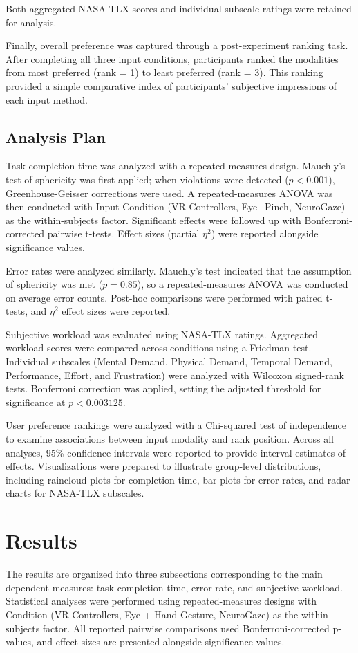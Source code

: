 \documentclass[utf8]{FrontiersinHarvard} %
\begin{document}
Both aggregated NASA-TLX scores and individual subscale ratings were retained for analysis.

Finally, overall preference was captured through a post-experiment ranking task. After completing all three input conditions, participants ranked the modalities from most preferred (rank = 1) to least preferred (rank = 3). This ranking provided a simple comparative index of participants' subjective impressions of each input method.

\subsection{Analysis Plan}
Task completion time was analyzed with a repeated-measures design. Mauchly's test of sphericity was first applied; when violations were detected ($p < 0.001$), Greenhouse-Geisser corrections were used. A repeated-measures ANOVA was then conducted with Input Condition (VR Controllers, Eye+Pinch, NeuroGaze) as the within-subjects factor. Significant effects were followed up with Bonferroni-corrected pairwise t-tests. Effect sizes (partial $\eta^2$) were reported alongside significance values.

Error rates were analyzed similarly. Mauchly's test indicated that the assumption of sphericity was met ($p = 0.85$), so a repeated-measures ANOVA was conducted on average error counts. Post-hoc comparisons were performed with paired t-tests, and $\eta^2$ effect sizes were reported.

Subjective workload was evaluated using NASA-TLX ratings. Aggregated workload scores were compared across conditions using a Friedman test. Individual subscales (Mental Demand, Physical Demand, Temporal Demand, Performance, Effort, and Frustration) were analyzed with Wilcoxon signed-rank tests. Bonferroni correction was applied, setting the adjusted threshold for significance at $p < 0.003125$.

User preference rankings were analyzed with a Chi-squared test of independence to examine associations between input modality and rank position.
Across all analyses, 95\% confidence intervals were reported to provide interval estimates of effects. Visualizations were prepared to illustrate group-level distributions, including raincloud plots for completion time, bar plots for error rates, and radar charts for NASA-TLX subscales.

\section{Results}
The results are organized into three subsections corresponding to the main dependent measures: task completion time, error rate, and subjective workload. Statistical analyses were performed using repeated-measures designs with Condition (VR Controllers, Eye + Hand Gesture, NeuroGaze) as the within-subjects factor. All reported pairwise comparisons used Bonferroni-corrected p-values, and effect sizes are presented alongside significance values.
\end{document}
